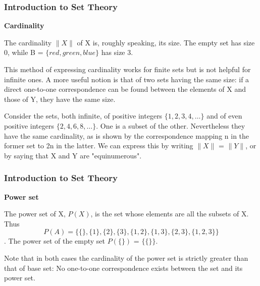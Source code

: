 \documentclass[12pt]{article}
\begin{document}
\begin{frame}
	\frametitle{Introduction to Set Theory}
	\large
\textbf{Cardinality}

The cardinality $\|X\|$ of X is, roughly speaking, its size. The empty set has size 0, while B = $\{red, green, blue\}$ has size 3. 

This method of expressing cardinality works for finite sets but is not helpful for infinite ones. A more useful notion is that of two sets having the same size: if a direct one-to-one correspondence can be found between the elements of X and those of Y, they have the same size. 

Consider the sets, both infinite, of positive integers $\{1,2,3,4, \ldots\}$ and of even positive integers $\{2,4,6,8, \ldots\}$. One is a subset of the other. Nevertheless they have the same cardinality, as is shown by the correspondence mapping n in the former set to 2n in the latter. We can express this by writing $\|X\|$ = $\|Y\|$, or by saying that X and Y are "equinumerous".
\end{frame}
\begin{frame}
	\frametitle{Introduction to Set Theory}
	\large
\textbf{Power set}

The power set of X, $P(X)$, is the set whose elements are all the subsets of X. Thus \[P(A) = \{ \{\}, \{1\}, \{2\}, \{3\}, \{1,2\}, \{1,3\}, \{2,3\}, \{1,2,3\}\}\]. The power set of the empty set $P(\{\})$ = $\{\{\}\}$. 

Note that in both cases the cardinality of the power set is strictly greater than that of base set: No one-to-one correspondence exists between the set and its power set. 

\end{frame}
\end{document}
